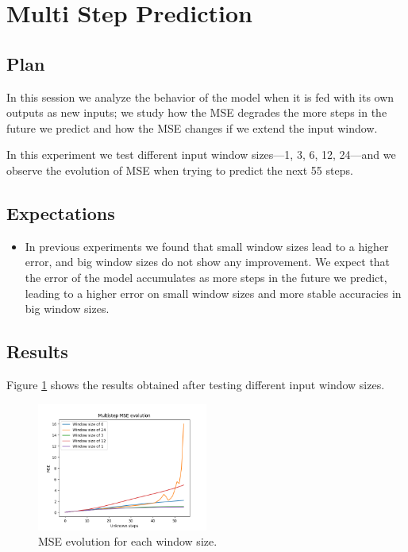 \documentclass[]{article}
\begin{document}
	\section{Multi Step Prediction}
	
	\subsection{Plan}
	
	In this session we analyze the behavior of the model when it is fed with its own outputs as new inputs; we study how the MSE degrades the more steps in the future we predict and how the MSE changes if we extend the input window.
	
	In this experiment we test different input window sizes---1, 3, 6, 12, 24---and we observe the evolution of MSE when trying to predict the next 55 steps.
	
	\subsection{Expectations}
	
	\begin{itemize}
		\item In previous experiments we found that small window sizes lead to a higher error, and big window sizes do not show any improvement. We expect that the error of the model accumulates as more steps in the future we predict, leading to a higher error on small window sizes and more stable accuracies in big window sizes.
	\end{itemize}
	
	\subsection{Results}
	
	Figure \ref{f:multistep} shows the results obtained after testing different input window sizes.
	
	\begin{figure}[H]
		\centering
		\includegraphics[width=0.5\textwidth]{multistep}
		\caption{MSE evolution for each window size.}
		\label{f:multistep}
	\end{figure}
	
\end{document}
